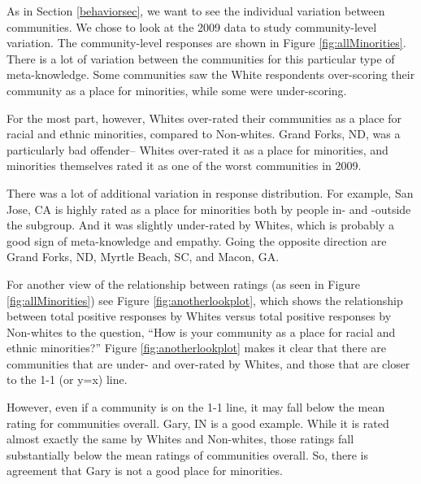 \documentclass[smallextended]{svjour3}\usepackage[]{graphicx}\usepackage[]{color}
\begin{document}
As in Section \ref{behaviorsec}, we want to see the individual variation between communities. We chose to look at the 2009 data to study community-level variation. The community-level responses are shown in Figure \ref{fig:allMinorities}. There is a lot of variation between the communities for this particular type of meta-knowledge. Some communities saw the White respondents over-scoring their community as a place for minorities, while some were under-scoring. 

For the most part, however, Whites over-rated their communities as a place for racial and ethnic minorities, compared to Non-whites. Grand Forks, ND, was a particularly bad offender-- Whites over-rated it as a place for minorities, and minorities themselves rated it as one of the worst communities in 2009. 

There was a lot of additional variation in response distribution. For example, San Jose, CA is highly rated as a place for minorities both by people in- and -outside the subgroup. And it was slightly under-rated by Whites, which is probably a good sign of meta-knowledge and empathy. Going the opposite direction are Grand Forks, ND, Myrtle Beach, SC, and Macon, GA. 

For another view of the relationship between ratings (as seen in Figure \ref{fig:allMinorities}) see Figure \ref{fig:anotherlookplot}, which shows the relationship between  total positive responses by Whites versus total positive responses by Non-whites to the question, ``How is your community as a place for racial and ethnic minorities?'' Figure \ref{fig:anotherlookplot} makes it clear that there are communities that are under- and over-rated by Whites, and those that are closer to the 1-1 (or y=x) line. 

However, even if a community is on the 1-1 line, it may fall below the mean rating for communities overall. Gary, IN is a good example. While it is rated almost exactly the same by Whites and Non-whites, those ratings fall substantially below the mean ratings of communities overall. So, there is agreement that Gary is not a good place for minorities. 
\end{document}
